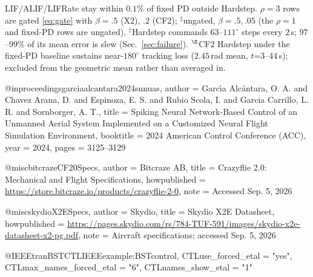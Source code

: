 LIF/ALIF/LIFRate stay within $0.1\%$ of fixed PD outside Hardstep. $\rho=3$ rows are gated \eqref{eq:gate} with $\beta=.5$ (X2), $.2$ (CF2); $^\ddagger$ungated, $\beta=.5,.05$ (the $\rho=1$ and fixed-PD rows are ungated). $^\dagger$Hardstep commands $63$--$111^\circ$ steps every $2$\,s; $97$--$99\%$ of its mean error is slew (Sec.~\ref{sec:failure}). $^\S$CF2 Hardstep under the fixed-PD baseline sustains near-$180^\circ$ tracking loss ($2.45$\,rad mean, $t$=3--44\,s); excluded from the geometric mean rather than averaged in.



@inproceedings{garciaalcantara2024snnuas,
  author    = {Garc{\'\i}a Alc{\'a}ntara, O. A. and Chavez Arana, D. and Espinoza, E. S. and Rubio Scola, I. and Garcia Carrillo, L. R. and Sornborger, A. T.},
  title     = {Spiking Neural Network-Based Control of an Unmanned Aerial System Implemented on a Customized Neural Flight Simulation Environment},
  booktitle = {2024 American Control Conference (ACC)},
  year      = {2024},
  pages     = {3125--3129}
}

@misc{bitcrazeCF20Specs,
  author       = {{Bitcraze AB}},
  title        = {Crazyflie 2.0: Mechanical and Flight Specifications},
  howpublished = {\url{https://store.bitcraze.io/products/crazyflie-2-0}},
  note         = {Accessed Sep. 5, 2026}
}

@misc{skydioX2ESpecs,
  author       = {{Skydio}},
  title        = {Skydio {X2E} Datasheet},
  howpublished = {\url{https://pages.skydio.com/rs/784-TUF-591/images/skydio-x2e-datasheet-x2-pg.pdf}},
  note         = {Aircraft specifications; accessed Sep. 5, 2026}
}

@IEEEtranBSTCTL{IEEEexample:BSTcontrol,
  CTLuse_forced_etal       = "yes",
  CTLmax_names_forced_etal = "6",
  CTLnames_show_etal       = "1"
}


